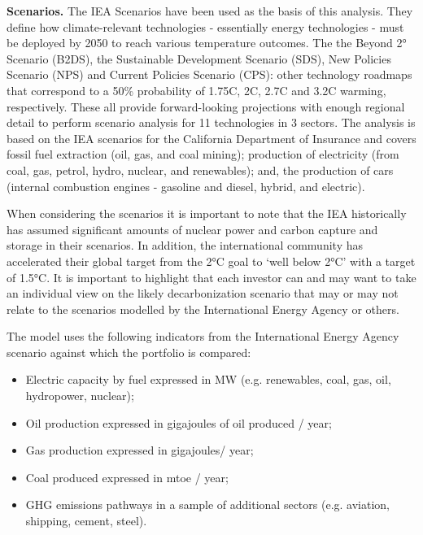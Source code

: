 \documentclass[10pt,table,a4]{article}\usepackage[]{graphicx}\usepackage[]{color}
\begin{document}
\begin{multicols}{2}
		\textbf{Scenarios.} The IEA Scenarios have been used as the basis of this analysis. They define how climate-relevant technologies - 	essentially energy technologies - must be deployed by 2050 to reach various temperature outcomes. The the Beyond 2° Scenario (B2DS), the Sustainable Development Scenario (SDS), New Policies Scenario (NPS) and Current Policies Scenario (CPS): other technology roadmaps that correspond to a 50\% probability of 1.75\degree C, 2\degree C, 2.7\degree C and 3.2\degree C warming, respectively. These all provide forward-looking projections with enough regional detail to perform scenario analysis for 11 technologies in 3 sectors. The analysis is based on the IEA scenarios for the California Department of Insurance and covers fossil fuel extraction (oil, gas, and coal mining); production of electricity (from coal, gas, petrol, hydro, nuclear, and renewables); and, the production of cars (internal combustion engines - gasoline and diesel, hybrid, and electric).
		
		When considering the scenarios it is important to note that the IEA historically has assumed significant amounts of nuclear power and carbon capture and storage in their scenarios. In addition, the international community has accelerated their global target from the 2°C goal to `well below 2°C' with a target of 1.5°C. It is important to highlight that each investor can and may want to take an individual view on the likely decarbonization scenario that may or may not relate to the scenarios modelled by the International Energy Agency or others.
		
		The model uses the following indicators from the International Energy Agency scenario against which the portfolio is compared:
		\begin{itemize}
			\item{Electric capacity by fuel expressed in MW (e.g. renewables, coal, gas, oil, hydropower, nuclear);}
			\item{Oil production expressed in gigajoules of oil produced / year;}
			\item{Gas production expressed in gigajoules/ year;}
			\item{Coal produced expressed in mtoe / year;}
			\item{GHG emissions pathways in a sample of additional sectors (e.g. aviation, shipping, cement, steel).}
		\end{itemize}
		

\end{multicols}
\end{document}
